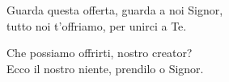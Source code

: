 
\strofa Guarda questa offerta, guarda a noi Signor,\\
tutto noi t'offriamo, per unirci a Te.

\spazio

 

\spazio

\strofa Che possiamo offrirti, nostro creator?\\
Ecco il nostro niente, prendilo o Signor.

\spazio

